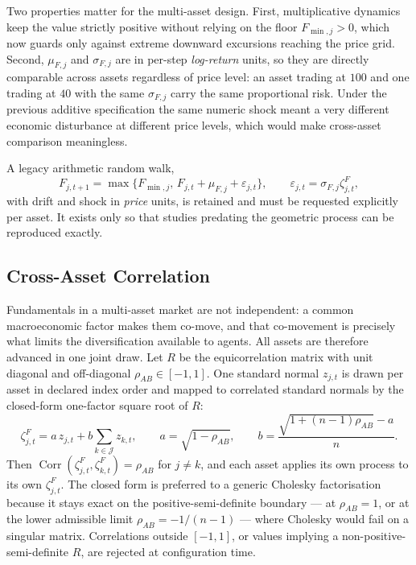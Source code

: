 \documentclass[12pt, a4paper]{article}
\DeclareMathOperator{\Corr}{Corr}
\begin{document}
    Two properties matter for the multi-asset design. First, multiplicative
    dynamics keep the value strictly positive without relying on the floor
    \(F_{\min,j}>0\), which now guards only against extreme downward excursions
    reaching the price grid. Second, \(\mu_{F,j}\) and \(\sigma_{F,j}\) are in
    per-step \emph{log-return} units, so they are directly comparable across
    assets regardless of price level: an asset trading at \(100\) and one trading
    at \(40\) with the same \(\sigma_{F,j}\) carry the same proportional risk.
    Under the previous additive specification the same numeric shock meant a very
    different economic disturbance at different price levels, which would make
    cross-asset comparison meaningless.

    A legacy arithmetic random walk,
    \[
        F_{j,t+1}=\max\{F_{\min,j},\,F_{j,t}+\mu_{F,j}+\varepsilon_{j,t}\},
        \qquad
        \varepsilon_{j,t}=\sigma_{F,j}\zeta_{j,t}^{F},
    \]
    with drift and shock in \emph{price} units, is retained and must be requested
    explicitly per asset. It exists only so that studies predating the geometric
    process can be reproduced exactly.

    \subsection{Cross-Asset Correlation}\label{sec:fundamental_correlation}

    Fundamentals in a multi-asset market are not independent: a common
    macroeconomic factor makes them co-move, and that co-movement is precisely
    what limits the diversification available to agents. All assets are therefore
    advanced in one joint draw. Let \(R\) be the equicorrelation matrix with unit
    diagonal and off-diagonal \(\rho_{AB}\in[-1,1]\). One standard normal
    \(z_{j,t}\) is drawn per asset in declared index order and mapped to
    correlated standard normals by the closed-form one-factor square root of
    \(R\):
    \[
        \zeta_{j,t}^{F}
        =
        a\,z_{j,t}+b\sum_{k\in\mathcal{J}}z_{k,t},
        \qquad
        a=\sqrt{1-\rho_{AB}},
        \qquad
        b=\frac{\sqrt{1+(n-1)\rho_{AB}}-a}{n}.
    \]
    Then \(\Corr(\zeta_{j,t}^{F},\zeta_{k,t}^{F})=\rho_{AB}\) for \(j\ne k\), and
    each asset applies its own process to its own \(\zeta_{j,t}^{F}\). The
    closed form is preferred to a generic Cholesky factorisation because it stays
    exact on the positive-semi-definite boundary --- at \(\rho_{AB}=1\), or at the
    lower admissible limit \(\rho_{AB}=-1/(n-1)\) --- where Cholesky would fail on
    a singular matrix. Correlations outside \([-1,1]\), or values implying a
    non-positive-semi-definite \(R\), are rejected at configuration time.
\end{document}
